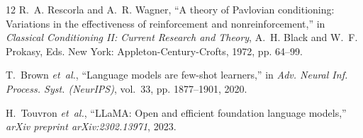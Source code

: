 \documentclass[11pt,journal,onecolumn]{IEEEtran}
\begin{document}
\begin{thebibliography}{12}
R.~A. Rescorla and A.~R. Wagner, ``A theory of Pavlovian conditioning: Variations in the effectiveness of reinforcement and nonreinforcement,'' in \emph{Classical Conditioning II: Current Research and Theory}, A.~H. Black and W.~F. Prokasy, Eds. New York: Appleton-Century-Crofts, 1972, pp. 64--99.

T.~Brown \emph{et~al.}, ``Language models are few-shot learners,'' in \emph{Adv. Neural Inf. Process. Syst. (NeurIPS)}, vol.~33, pp. 1877--1901, 2020.

H.~Touvron \emph{et~al.}, ``LLaMA: Open and efficient foundation language models,'' \emph{arXiv preprint arXiv:2302.13971}, 2023.
\end{thebibliography}
\end{document}
